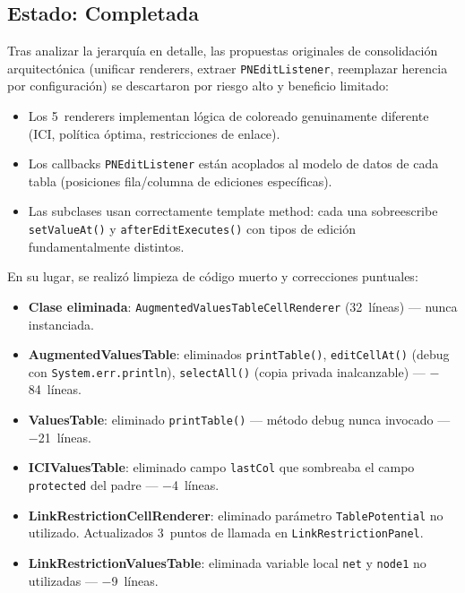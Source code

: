 \documentclass[12pt,a4paper]{article}
\newcommand{\code}[1]{\texttt{#1}}
\newcommand{\clase}[1]{\texttt{#1}}
\begin{document}
\subsection{Estado: Completada}

Tras analizar la jerarquía en detalle, las propuestas originales de
consolidación arquitectónica (unificar renderers, extraer
\code{PNEditListener}, reemplazar herencia por configuración) se
descartaron por riesgo alto y beneficio limitado:

\begin{itemize}[nosep]
  \item Los 5~renderers implementan lógica de coloreado genuinamente
        diferente (ICI, política óptima, restricciones de enlace).
  \item Los callbacks \code{PNEditListener} están acoplados al modelo
        de datos de cada tabla (posiciones fila/columna de ediciones
        específicas).
  \item Las subclases usan correctamente template method: cada una
        sobreescribe \code{setValueAt()} y \code{afterEditExecutes()}
        con tipos de edición fundamentalmente distintos.
\end{itemize}

En su lugar, se realizó limpieza de código muerto y correcciones
puntuales:

\begin{itemize}[nosep]
  \item \textbf{Clase eliminada}: \clase{AugmentedValuesTableCellRenderer}
        (32~líneas) --- nunca instanciada.
  \item \textbf{AugmentedValuesTable}: eliminados \code{printTable()},
        \code{editCellAt()} (debug con \code{System.err.println}),
        \code{selectAll()} (copia privada inalcanzable) --- $-$84~líneas.
  \item \textbf{ValuesTable}: eliminado \code{printTable()} --- método
        debug nunca invocado --- $-$21~líneas.
  \item \textbf{ICIValuesTable}: eliminado campo \code{lastCol} que
        sombreaba el campo \code{protected} del padre --- $-$4~líneas.
  \item \textbf{LinkRestrictionCellRenderer}: eliminado parámetro
        \code{TablePotential} no utilizado. Actualizados 3~puntos de
        llamada en \clase{LinkRestrictionPanel}.
  \item \textbf{LinkRestrictionValuesTable}: eliminada variable local
        \code{net} y \code{node1} no utilizadas --- $-$9~líneas.
\end{itemize}
\end{document}
